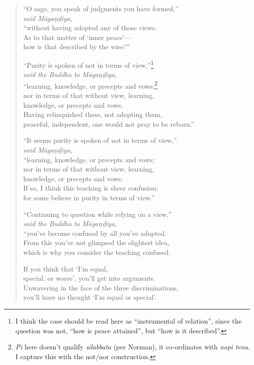 \documentclass[12pt,openany]{book}%
\newcommand*{\scspeaker}[1]{\hspace{2em}\textit{#1}}
\begin{document}
\begin{verse}
“O sage, you speak of judgments you have formed,” \\
\scspeaker{said \textsanskrit{Māgaṇḍiya}, }\\
“without having adopted any of those views. \\
As to that matter of ‘inner peace’—\\
how is that described by the wise?” 

“Purity is spoken of not in terms of view,”\footnote{I think the case should be read here as “instrumental of relation”, since the question was not, “how is peace attained”, but “how is it described”. } \\
\scspeaker{said the Buddha to \textsanskrit{Māgaṇḍiya}, }\\
“learning, knowledge, or precepts and vows;\footnote{\textit{Pi} here doesn’t qualify \textit{\textsanskrit{sīlabbata}} (per Norman), it co-ordinates with \textit{nopi tena}. I capture this with the not/nor construction. } \\
nor in terms of that without view, learning, \\
knowledge, or precepts and vows. \\
Having relinquished these, not adopting them, \\
peaceful, independent, one would not pray to be reborn.” 

“It seems purity is spoken of not in terms of view,” \\
\scspeaker{said \textsanskrit{Māgaṇḍiya}, }\\
“learning, knowledge, or precepts and vows; \\
nor in terms of that without view, learning, \\
knowledge, or precepts and vows. \\
If so, I think this teaching is sheer confusion; \\
for some believe in purity in terms of view.” 

“Continuing to question while relying on a view,” \\
\scspeaker{said the Buddha to \textsanskrit{Māgaṇḍiya}, }\\
“you’ve become confused by all you’ve adopted. \\
From this you’ve not glimpsed the slightest idea, \\
which is why you consider the teaching confused. 

If you think that ‘I’m equal, \\
special, or worse’, you’ll get into arguments. \\
Unwavering in the face of the three discriminations, \\
you’ll have no thought ‘I’m equal or special’. 


\end{verse}
\end{document}
